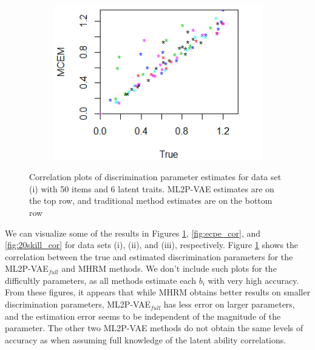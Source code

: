 \begin{figure}[h]
\begin{subfigure}{.32\textwidth}
    \end{subfigure}
    \begin{subfigure}{.32\textwidth}
      \centering
      \includegraphics[width=.9\linewidth]{img/ml_journal_results/6skills/mcem_disc_6skills.png}
    \end{subfigure}
    \caption{Correlation plots of discrimination parameter estimates for data set (i) with 50 items and 6 latent traits. ML2P-VAE estimates are on the top row, and traditional method estimates are on the bottom row}
    \label{fig:6skill_cor}
\end{figure}

We can visualize some of the results in Figures \ref{fig:6skill_cor}, \ref{fig:ecpe_cor}, and \ref{fig:20skill_cor} for data sets (i), (ii), and (iii), respectively. Figure \ref{fig:6skill_cor} shows the correlation between the true and estimated discrimination parameters for the ML2P-VAE$_{full}$ and MHRM methods. We don't include such plots for the difficultly parameters, as all methods estimate each $b_i$ with very high accuracy. From these figures, it appears that while MHRM obtains better results on smaller discrimination parameters, ML2P-VAE$_{full}$ has less error on larger parameters, and the estimation error seems to be independent of the magnitude of the parameter. The other two ML2P-VAE methods do not obtain the same levels of accuracy as when assuming full knowledge of the latent ability correlations. 

